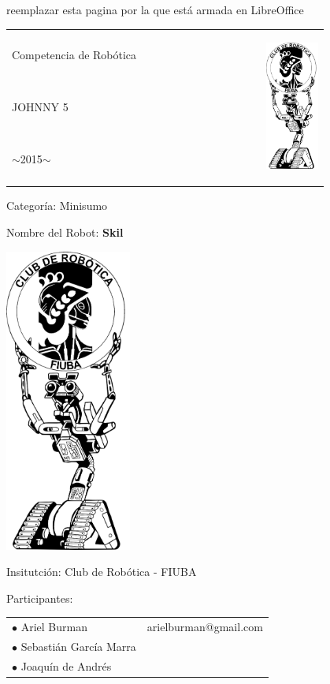 {
  
\centering reemplazar esta pagina por la que está armada en LibreOffice

\begin{center}
  \begin{tabular}{p{0.8\linewidth} p{3cm}}
    \Huge Competencia de Robótica & \multirow{3}{*}{\includegraphics[height=5cm]{img/logo_johnny5.png}} \\
    {\Huge JOHNNY 5 }& \\
    $\sim$2015$\sim$&
  \end{tabular}
\end{center}
\large

\vspace{2cm}

Categoría: Minisumo

\vspace{.5cm}

Nombre del Robot: {\bfseries Skil}

\vspace{.5cm}

\begin{center}
\includegraphics[height=10cm]{img/logo_johnny5.png}
\end{center}

\vspace{.5cm}

Insitutción: Club de Robótica - FIUBA

\vspace{.5cm}

Participantes:

\vspace{.5cm}

\begin{tabular}{ll}
  $\bullet$ Ariel Burman & arielburman@gmail.com \\
  $\bullet$ Sebastián García Marra&  \\
  $\bullet$ Joaquín de Andrés &
\end{tabular}

}
